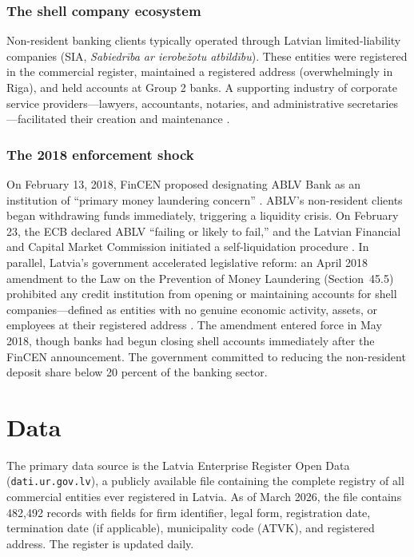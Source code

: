 \documentclass[12pt]{article}
\begin{document}
\subsubsection*{The shell company ecosystem} Non-resident banking clients typically operated through Latvian limited-liability companies (SIA, \textit{Sabiedrība ar ierobežotu atbildību}). These entities were registered in the commercial register, maintained a registered address (overwhelmingly in Riga), and held accounts at Group 2 banks. A supporting industry of corporate service providers---lawyers, accountants, notaries, and administrative secretaries---facilitated their creation and maintenance \citep{Sharman2011,Findley2015}.

\subsubsection*{The 2018 enforcement shock} On February 13, 2018, FinCEN proposed designating ABLV Bank as an institution of ``primary money laundering concern'' \citep{FinCEN2018}. ABLV's non-resident clients began withdrawing funds immediately, triggering a liquidity crisis. On February 23, the ECB declared ABLV ``failing or likely to fail,'' and the Latvian Financial and Capital Market Commission initiated a self-liquidation procedure \citep{FCMC2018}. In parallel, Latvia's government accelerated legislative reform: an April 2018 amendment to the Law on the Prevention of Money Laundering (Section~45.5) prohibited any credit institution from opening or maintaining accounts for shell companies---defined as entities with no genuine economic activity, assets, or employees at their registered address \citep{LatvianLaw2018}. The amendment entered force in May 2018, though banks had begun closing shell accounts immediately after the FinCEN announcement. The government committed to reducing the non-resident deposit share below 20 percent of the banking sector.

\section{Data}
\label{sec:data}

The primary data source is the Latvia Enterprise Register Open Data (\texttt{dati.ur.gov.lv}), a publicly available file containing the complete registry of all commercial entities ever registered in Latvia. As of March 2026, the file contains 482,492 records with fields for firm identifier, legal form, registration date, termination date (if applicable), municipality code (ATVK), and registered address. The register is updated daily.
\end{document}
